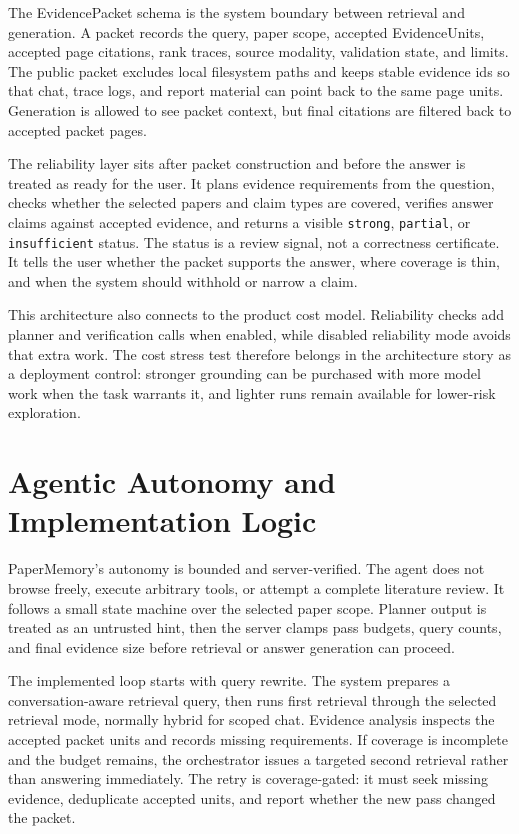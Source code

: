 \documentclass{article}
\begin{document}
The EvidencePacket schema is the system boundary between retrieval and generation. A packet records the query, paper scope, accepted EvidenceUnits, accepted page citations, rank traces, source modality, validation state, and limits. The public packet excludes local filesystem paths and keeps stable evidence ids so that chat, trace logs, and report material can point back to the same page units. Generation is allowed to see packet context, but final citations are filtered back to accepted packet pages.

The reliability layer sits after packet construction and before the answer is treated as ready for the user. It plans evidence requirements from the question, checks whether the selected papers and claim types are covered, verifies answer claims against accepted evidence, and returns a visible \texttt{strong}, \texttt{partial}, or \texttt{insufficient} status. The status is a review signal, not a correctness certificate. It tells the user whether the packet supports the answer, where coverage is thin, and when the system should withhold or narrow a claim.

This architecture also connects to the product cost model. Reliability checks add planner and verification calls when enabled, while disabled reliability mode avoids that extra work. The cost stress test therefore belongs in the architecture story as a deployment control: stronger grounding can be purchased with more model work when the task warrants it, and lighter runs remain available for lower-risk exploration.

\section{Agentic Autonomy and Implementation Logic}

PaperMemory's autonomy is bounded and server-verified. The agent does not browse freely, execute arbitrary tools, or attempt a complete literature review. It follows a small state machine over the selected paper scope. Planner output is treated as an untrusted hint, then the server clamps pass budgets, query counts, and final evidence size before retrieval or answer generation can proceed.



The implemented loop starts with query rewrite. The system prepares a conversation-aware retrieval query, then runs first retrieval through the selected retrieval mode, normally hybrid for scoped chat. Evidence analysis inspects the accepted packet units and records missing requirements. If coverage is incomplete and the budget remains, the orchestrator issues a targeted second retrieval rather than answering immediately. The retry is coverage-gated: it must seek missing evidence, deduplicate accepted units, and report whether the new pass changed the packet.
\end{document}
